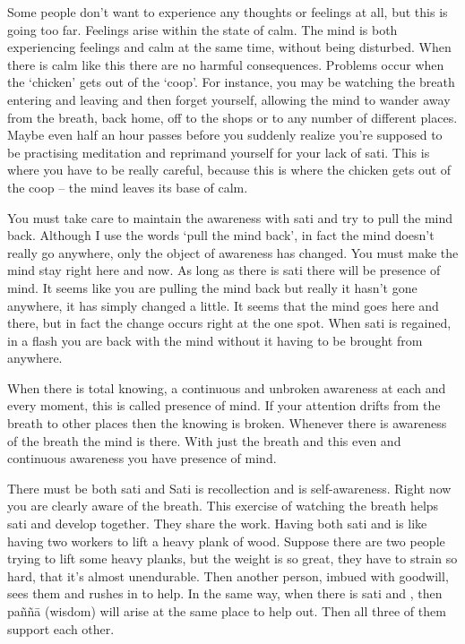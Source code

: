 Some people don't want to experience any thoughts or feelings at all, but this is going too far. Feelings arise within the state of calm. The mind is both experiencing feelings and calm at the same time, without being disturbed. When there is calm like this there are no harmful consequences. Problems occur when the `chicken' gets out of the `coop'. For instance, you may be watching the breath entering and leaving and then forget yourself, allowing the mind to wander away from the breath, back home, off to the shops or to any number of different places. Maybe even half an hour passes before you suddenly realize you're supposed to be practising meditation and reprimand yourself for your lack of sati. This is where you have to be really careful, because this is where the chicken gets out of the coop -- the mind leaves its base of calm.

You must take care to maintain the awareness with sati and try to pull the mind back. Although I use the words `pull the mind back', in fact the mind doesn't really go anywhere, only the object of awareness has changed. You must make the mind stay right here and now. As long as there is sati there will be presence of mind. It seems like you are pulling the mind back but really it hasn't gone anywhere, it has simply changed a little. It seems that the mind goes here and there, but in fact the change occurs right at the one spot. When sati is regained, in a flash you are back with the mind without it having to be brought from anywhere.

When there is total knowing, a continuous and unbroken awareness at each and every moment, this is called presence of mind. If your attention drifts from the breath to other places then the knowing is broken. Whenever there is awareness of the breath the mind is there. With just the breath and this even and continuous awareness you have presence of mind.

There must be both sati and  Sati is recollection and  is self-awareness. Right now you are clearly aware of the breath. This exercise of watching the breath helps sati and  develop together. They share the work. Having both sati and  is like having two workers to lift a heavy plank of wood. Suppose there are two people trying to lift some heavy planks, but the weight is so great, they have to strain so hard, that it's almost unendurable. Then another person, imbued with goodwill, sees them and rushes in to help. In the same way, when there is sati and , then pa\~n\~n\=a (wisdom) will arise at the same place to help out. Then all three of them support each other.

